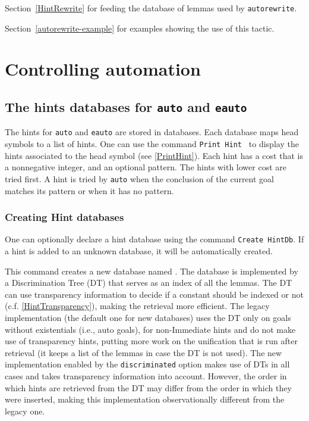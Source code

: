 \SeeAlso Section~\ref{HintRewrite} for feeding the database of lemmas used by {\tt autorewrite}.

\SeeAlso Section~\ref{autorewrite-example} for examples showing the use of
this tactic.


\section{Controlling automation}

\subsection{The hints databases for {\tt auto} and {\tt eauto}}
\label{Hints-databases}

The hints for \texttt{auto} and \texttt{eauto} are stored in
databases.  Each database maps head symbols to a list of hints. One can
use the command \texttt{Print Hint \ident} to display the hints
associated to the head symbol \ident{} (see \ref{PrintHint}). Each
hint has a cost that is a nonnegative integer, and an optional pattern.
The hints with lower cost are tried first. A hint is tried by
\texttt{auto} when the conclusion of the current goal
matches its pattern or when it has no pattern.

\subsubsection*{Creating Hint databases
  \label{CreateHintDb}}

One can optionally declare a hint database using the command
\texttt{Create HintDb}. If a hint is added to an unknown database, it
will be automatically created.

\medskip
{}
\medskip

This command creates a new database named \ident.
The database is implemented by a Discrimination Tree (DT) that serves as
an index of all the lemmas. The DT can use transparency information to decide
if a constant should be indexed or not (c.f. \ref{HintTransparency}),
making the retrieval more efficient.
The legacy implementation (the default one for new databases) uses the
DT only on goals without existentials (i.e., auto goals), for non-Immediate
hints and do not make use of transparency hints, putting more work on the
unification that is run after retrieval (it keeps a list of the lemmas
in case the DT is not used). The new implementation enabled by
the {\tt discriminated} option makes use of DTs in all cases and takes
transparency information into account. However, the order in which hints
are retrieved from the DT may differ from the order in which they were
inserted, making this implementation observationally different from the
legacy one.


